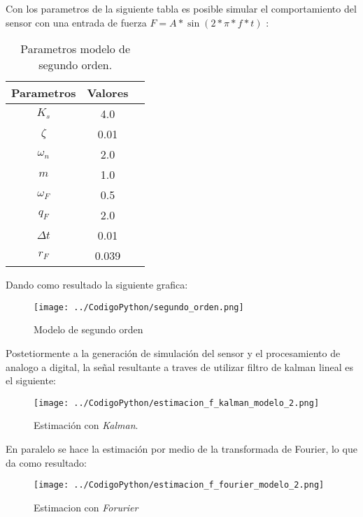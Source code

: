 \documentclass[conference]{IEEEtran}
\begin{document}
Con los parametros de la siguiente tabla es posible simular el comportamiento del sensor con una entrada de fuerza $F = A * \sin (2 * \pi * f * t)$ :

\begin{table}[h]
	\centering
	\caption{Parametros modelo de segundo orden.}
	\label{tab:parametros_segundo_orden}
	\begin{tabular}{|c|c|c|}
		\hline
		\textbf{Parametros} & \textbf{Valores} \\
		\hline
		$K_s$ & 4.0 \\
		$\zeta$  & 0.01 \\
		$\omega_n$      & 2.0 \\
		$m$ & 1.0 \\
		$\omega_F$ &  0.5 \\
		$ q_F $  &  2.0 \\
		$\Delta t$ & 0.01 \\  
		$r_F$ & 0.039 \\ 
		\hline
	\end{tabular}
	
\end{table}

Dando como resultado la siguiente grafica:


\begin{figure}[h!]
	\centering
	\texttt{[image: ../CodigoPython/segundo\_orden.png]}
	\caption{Modelo de segundo orden}
	\label{fig:segundo_orden}
\end{figure}

Postetiormente a la generación de simulación del sensor y el procesamiento de analogo a digital,
la señal resultante a traves de utilizar filtro de kalman lineal es el siguiente:

\begin{figure}[h]
	\centering
	\texttt{[image: ../CodigoPython/estimacion\_f\_kalman\_modelo\_2.png]}
	\caption{Estimaci\'on con \textit{Kalman}.}
	\label{fig:f_modelo_2}
\end{figure}




En paralelo se hace la estimación por medio de la transformada de Fourier, lo que da como resultado:

\begin{figure}[h]
	\centering
	\texttt{[image: ../CodigoPython/estimacion\_f\_fourier\_modelo\_2.png]}
	\caption{Estimacion con \textit{Forurier}}
	\label{fig:f_modelo_2}
\end{figure}
\end{document}
